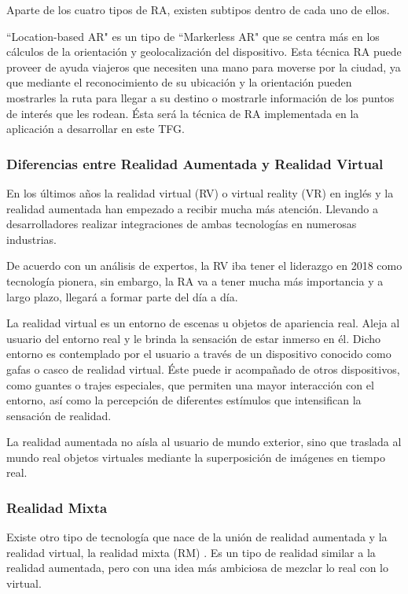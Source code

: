 Aparte de los cuatro tipos de RA, existen subtipos dentro de cada uno de ellos.

``Location-based AR" es un tipo de ``Markerless AR"  que se centra más en los cálculos de la orientación y geolocalización del dispositivo. Esta técnica RA puede proveer de ayuda viajeros que necesiten una mano para moverse por la ciudad, ya que mediante el reconocimiento de su ubicación y la orientación pueden mostrarles la ruta para llegar a su destino o mostrarle información de los puntos de interés que les rodean. Ésta será la técnica de RA implementada en la aplicación a desarrollar en este TFG. 


\subsubsection{Diferencias entre Realidad Aumentada y Realidad Virtual}
En los últimos años la realidad virtual (RV) \cite{URL::VR} o virtual reality (VR) en inglés y la realidad aumentada han empezado a recibir mucha más atención. Llevando a desarrolladores realizar integraciones de ambas tecnologías en numerosas industrias.

De acuerdo con un análisis de expertos, la RV iba tener el liderazgo en 2018 como tecnología pionera, sin embargo, la RA va a tener mucha más importancia y a largo plazo, llegará a formar parte del día a día.

La realidad virtual es un entorno de escenas u objetos de apariencia real. Aleja al usuario del entorno real y le brinda la sensación de estar inmerso en él. Dicho entorno es contemplado por el usuario a través de un dispositivo conocido como gafas o casco de realidad virtual. Éste puede ir acompañado de otros dispositivos, como guantes o trajes especiales, que permiten una mayor interacción con el entorno, así como la percepción de diferentes estímulos que intensifican la sensación de realidad.

La realidad aumentada no aísla al usuario de mundo exterior, sino que traslada al mundo real objetos virtuales mediante la superposición de imágenes en tiempo real. 

\subsubsection{Realidad Mixta}

Existe otro tipo de tecnología que nace de la unión de realidad aumentada y la realidad virtual, la realidad mixta (RM) \cite{URL::RM}. Es un tipo de realidad similar a la realidad aumentada, pero con una idea más ambiciosa de mezclar lo real con lo virtual.

